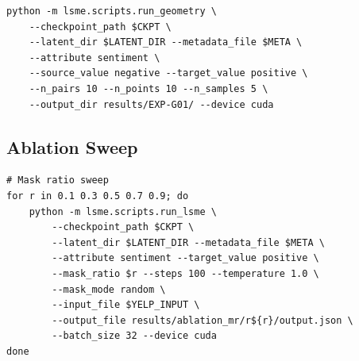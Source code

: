 \documentclass{article}
\begin{document}
\begin{verbatim}
python -m lsme.scripts.run_geometry \
    --checkpoint_path $CKPT \
    --latent_dir $LATENT_DIR --metadata_file $META \
    --attribute sentiment \
    --source_value negative --target_value positive \
    --n_pairs 10 --n_points 10 --n_samples 5 \
    --output_dir results/EXP-G01/ --device cuda
\end{verbatim}

\subsection{Ablation Sweep}

\begin{verbatim}
# Mask ratio sweep
for r in 0.1 0.3 0.5 0.7 0.9; do
    python -m lsme.scripts.run_lsme \
        --checkpoint_path $CKPT \
        --latent_dir $LATENT_DIR --metadata_file $META \
        --attribute sentiment --target_value positive \
        --mask_ratio $r --steps 100 --temperature 1.0 \
        --mask_mode random \
        --input_file $YELP_INPUT \
        --output_file results/ablation_mr/r${r}/output.json \
        --batch_size 32 --device cuda
done
\end{verbatim}
\end{document}
